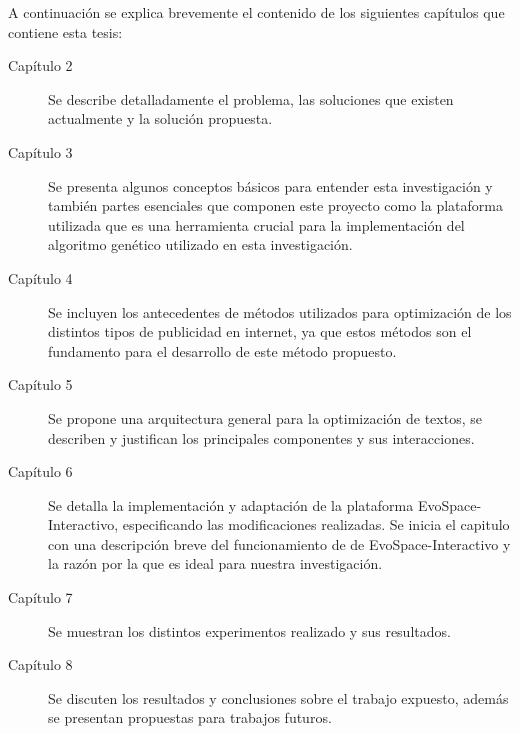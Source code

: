 A continuación se explica brevemente el contenido de los siguientes capítulos que contiene esta tesis:

\begin{description}

\item[Capítulo 2] Se describe detalladamente el problema, las soluciones que existen actualmente y la solución propuesta.

\item[Capítulo 3] Se presenta algunos conceptos básicos para entender esta investigación y también partes esenciales que componen este proyecto como la plataforma utilizada que es una herramienta crucial para la implementación del algoritmo genético utilizado en esta investigación.

\item[Capítulo 4] Se incluyen los antecedentes de métodos utilizados para optimización de los distintos tipos de publicidad en internet,  ya que estos métodos son el fundamento para el desarrollo de este método propuesto.

\item[Capítulo 5] Se propone una arquitectura general para la optimización de textos, se describen y justifican los principales componentes y sus interacciones.

\item[Capítulo 6] Se detalla la implementación y adaptación de la plataforma EvoSpace-Interactivo, especificando las modificaciones realizadas. Se inicia el capitulo con una descripción breve del funcionamiento de de EvoSpace-Interactivo y la razón por la que es ideal para nuestra investigación.

\item[Capítulo 7] Se muestran los distintos experimentos realizado y sus  resultados.

\item[Capítulo 8] Se discuten los resultados y conclusiones sobre el trabajo expuesto, además se presentan propuestas para trabajos futuros.

\end{description}

